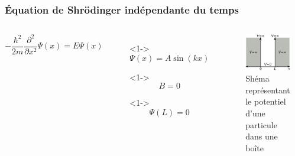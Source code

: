 \documentclass{beamer}
\begin{document}
\begin{frame}
\frametitle{Équation de Shrödinger indépendante du temps}

\begin{columns}

\begin{equation}\tag{4}
-\frac{\hbar^2}{2m}\frac{\partial^2}{\partial x^2}\Psi(x)=E\Psi(x)
\end{equation} 

\begin{itemize}
\item[]<1-> \begin{equation}\tag{5}
\Psi(x)=A\sin(kx)
\end{equation} 
\item[]<1-> \begin{equation}\tag{6}
B=0
\end{equation} 
\item[]<1-> \begin{equation}\tag{7}
\Psi(L)=0
\end{equation} 
\end{itemize}
\begin{figure}
\includegraphics[scale=0.4]{Pot}
\caption{Shéma représentant le potentiel d'une particule dans une boîte}
\end{figure}
\end{columns}

\end{frame}
\end{document}
